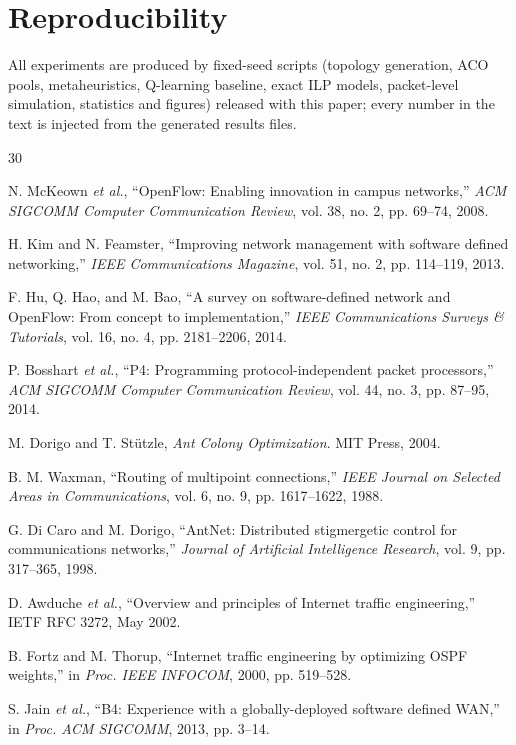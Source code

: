\documentclass[journal]{IEEEtran}
\begin{document}
\section*{Reproducibility}
All experiments are produced by fixed-seed scripts (topology generation,
ACO pools, metaheuristics, Q-learning baseline, exact ILP models,
packet-level simulation, statistics and figures) released with this paper;
every number in the text is injected from the generated results files.

\begin{thebibliography}{30}

 N. McKeown \emph{et al.}, ``OpenFlow: Enabling
innovation in campus networks,'' \emph{ACM SIGCOMM Computer Communication
Review}, vol. 38, no. 2, pp. 69--74, 2008.

 H. Kim and N. Feamster, ``Improving network management with
software defined networking,'' \emph{IEEE Communications Magazine}, vol. 51,
no. 2, pp. 114--119, 2013.

 F. Hu, Q. Hao, and M. Bao, ``A survey on software-defined
network and OpenFlow: From concept to implementation,'' \emph{IEEE
Communications Surveys \& Tutorials}, vol. 16, no. 4, pp. 2181--2206, 2014.

 P. Bosshart \emph{et al.}, ``P4: Programming
protocol-independent packet processors,'' \emph{ACM SIGCOMM Computer
Communication Review}, vol. 44, no. 3, pp. 87--95, 2014.

 M. Dorigo and T. St\"utzle, \emph{Ant Colony
Optimization}. MIT Press, 2004.

 B. M. Waxman, ``Routing of multipoint connections,''
\emph{IEEE Journal on Selected Areas in Communications}, vol. 6, no. 9,
pp. 1617--1622, 1988.

 G. Di Caro and M. Dorigo, ``AntNet: Distributed
stigmergetic control for communications networks,'' \emph{Journal of
Artificial Intelligence Research}, vol. 9, pp. 317--365, 1998.

 D. Awduche \emph{et al.}, ``Overview and principles of
Internet traffic engineering,'' IETF RFC 3272, May 2002.

 B. Fortz and M. Thorup, ``Internet traffic engineering by
optimizing OSPF weights,'' in \emph{Proc. IEEE INFOCOM}, 2000,
pp. 519--528.

 S. Jain \emph{et al.}, ``B4: Experience with a
globally-deployed software defined WAN,'' in \emph{Proc. ACM SIGCOMM},
2013, pp. 3--14.


\end{thebibliography}
\end{document}

